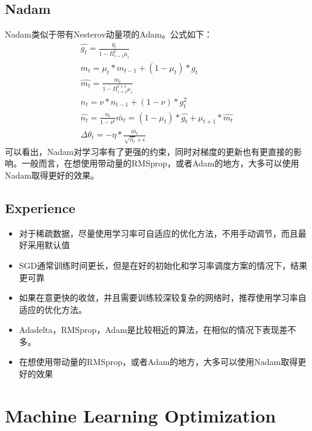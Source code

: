 \subsection{Nadam}
Nadam类似于带有Nesterov动量项的Adam。公式如下：
\begin{eqnarray*}
\hat{g_t}=\frac{g_t}{1-\Pi_{i=1}^t\mu_i}  \\
m_t=\mu_t*m_{t-1}+(1-\mu_t)*g_t  \\
\hat{m_t}=\frac{m_t}{1-\Pi_{i=1}^{t+1}\mu_i}  \\
n_t=\nu*n_{t-1}+(1-\nu)*g_t^2  \\
\hat{n_t}=\frac{n_t}{1-\nu^t}\bar{m_t}=(1-\mu_t)*\hat{g_t}+\mu_{t+1}*\hat{m_t}  \\
\Delta{\theta_t}=-\eta*\frac{\bar{m_t}}{\sqrt{\hat{n_t}}+\epsilon}
\end{eqnarray*}
可以看出，Nadam对学习率有了更强的约束，同时对梯度的更新也有更直接的影响。一般而言，在想使用带动量的RMSprop，或者Adam的地方，大多可以使用Nadam取得更好的效果。

\subsection{Experience}
\begin{itemize}
\item 对于稀疏数据，尽量使用学习率可自适应的优化方法，不用手动调节，而且最好采用默认值
\item SGD通常训练时间更长，但是在好的初始化和学习率调度方案的情况下，结果更可靠
\item 如果在意更快的收敛，并且需要训练较深较复杂的网络时，推荐使用学习率自适应的优化方法。
\item Adadelta，RMSprop，Adam是比较相近的算法，在相似的情况下表现差不多。
\item 在想使用带动量的RMSprop，或者Adam的地方，大多可以使用Nadam取得更好的效果
\end{itemize}
\section{Machine Learning Optimization}
